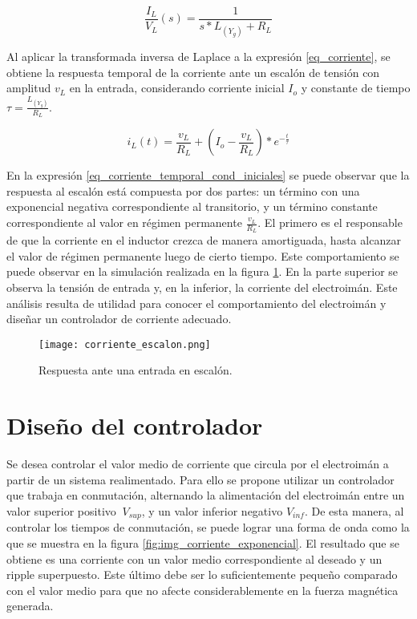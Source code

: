 \begin{equation} \label{eq_corriente}
\frac{I_L}{V_L}(s)=\frac{1}{s*L_{(Y_g)}+R_L}
\end{equation}

Al aplicar la transformada inversa de Laplace a la expresión  \ref{eq_corriente}, se obtiene la respuesta temporal de la corriente ante un escalón de tensión con amplitud $v_L$ en la entrada, considerando corriente inicial $I_o$ y constante de tiempo $\tau=\frac{L_{(Y_g)}}{R_L}$.

\begin{equation} \label{eq_corriente_temporal_cond_iniciales}
	i_L(t)=\frac{v_L}{R_L} + (I_o-\frac{v_L}{R_L})*e^{-\frac{t}{\tau}}
\end{equation}

En la expresión \ref{eq_corriente_temporal_cond_iniciales} se puede observar que la respuesta al escalón está compuesta por dos partes: un término con una exponencial negativa correspondiente al transitorio, y un término constante correspondiente al valor en régimen permanente $\frac{v_L}{R_L}$. El primero es el responsable de que la corriente en el inductor crezca de manera amortiguada, hasta alcanzar el valor de régimen permanente luego de cierto tiempo. Este comportamiento se puede observar en la simulación realizada en la figura \ref{fig:img_respuesta_escalon}. En la parte superior se observa la tensión de entrada y, en la inferior, la corriente del electroimán. Este análisis resulta de utilidad para conocer el comportamiento del electroimán y diseñar un controlador de corriente adecuado.


\begin{figure}[H]
	\centering
	\texttt{[image: corriente\_escalon.png]}
	\caption{Respuesta ante una entrada en escalón.}
	\label{fig:img_respuesta_escalon}
\end{figure}


\section{Diseño del controlador}


Se desea controlar el valor medio de corriente que circula por el electroimán a partir de un sistema realimentado. Para ello se propone utilizar un controlador que trabaja en conmutación, alternando la alimentación del electroimán entre un valor superior positivo $\ V_{sup}$, y un valor inferior negativo $V_{inf}$. De esta manera, al controlar los tiempos de conmutación, se puede lograr una forma de onda como la que se muestra en la figura  \ref{fig:img_corriente_exponencial}. El resultado que se obtiene es una corriente con un valor medio correspondiente al deseado y un ripple superpuesto. Este último debe ser lo suficientemente pequeño comparado con el valor medio para que no afecte considerablemente en la fuerza magnética generada. 

